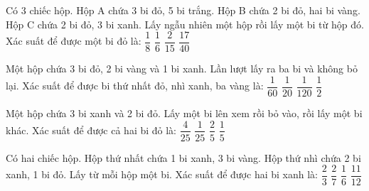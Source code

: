 \begin{ex}
Có 3 chiếc hộp. Hộp A chứa 3 bi đỏ, 5 bi trắng. Hộp B chứa 2 bi đỏ, hai bi vàng. Hộp C chứa 2 bi đỏ, 3 bi xanh. Lấy ngẫu nhiên một hộp rồi lấy một bi từ hộp đó. Xác suất để được một bi đỏ là:
\choice
{$\dfrac{1}{8}$}
{$\dfrac{1}{6}$}
{$\dfrac{2}{15}$}
{\True $\dfrac{17}{40}$}
\end{ex}
\begin{ex}
Một hộp chứa 3 bi đỏ, 2 bi vàng và 1 bi xanh. Lần lượt lấy ra ba bi và không bỏ lại. Xác suất để được bi thứ nhất đỏ, nhì xanh, ba vàng là:
\choice
{$\dfrac{1}{60}$}
{\True $\dfrac{1}{20}$}
{$\dfrac{1}{120}$}
{$\dfrac{1}{2}$}
\end{ex}
\begin{ex}
Một hộp chứa 3 bi xanh và 2 bi đỏ. Lấy một bi lên xem rồi bỏ vào, rồi lấy một bi khác. Xác suất để được cả hai bi đỏ là:
\choice
{$\dfrac{4}{25}$}
{$\dfrac{1}{25}$}
{\True $\dfrac{2}{5}$}
{$\dfrac{1}{5}$}
\end{ex}
\begin{ex}
Có hai chiếc hộp. Hộp thứ nhất chứa 1 bi xanh, 3 bi vàng. Hộp thứ nhì chứa 2 bi xanh, 1 bi đỏ. Lấy từ mỗi hộp một bi. Xác suất để được hai bi xanh là:
\choice
{$\dfrac{2}{3}$}
{$\dfrac{2}{7}$}
{\True $\dfrac{1}{6}$}
{$\dfrac{11}{12}$}
\end{ex}
